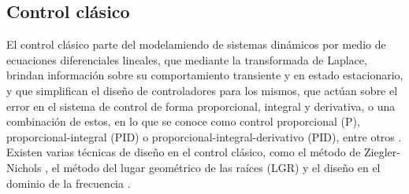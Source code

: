 \subsection{Control clásico}
El control clásico parte del modelamiendo de sistemas dinámicos por medio de ecuaciones diferenciales lineales, que mediante la transformada de Laplace, brindan información sobre su comportamiento transiente y en estado estacionario, y que simplifican el diseño de controladores para los mismos, que actúan sobre el error en el sistema de control de forma proporcional, integral y derivativa, o una combinación de estos, en lo que se conoce como control proporcional (P), proporcional-integral (PID) o proporcional-integral-derivativo (PID), entre otros \cite{ogata2010}. Existen varias técnicas de diseño en el control clásico, como el método de Ziegler-Nichols \cite{ogata2010}, el método del lugar geométrico de las raíces (LGR) y el diseño en el dominio de la frecuencia \cite{chen1993}.

